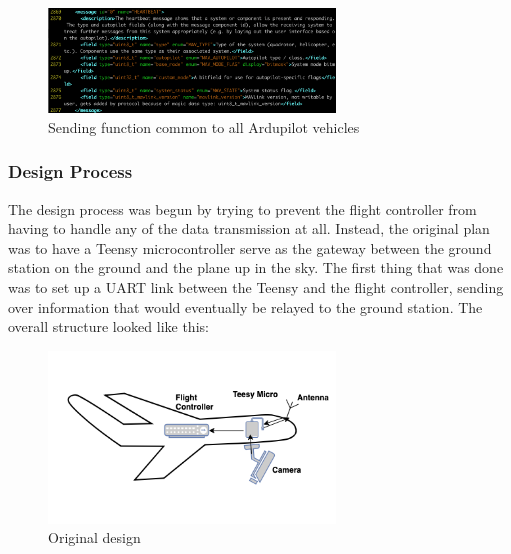\documentclass[12pt,journal,compsoc]{IEEEtran}
\begin{document}
\begin{figure}[h!]
\hspace*{0cm}
\centering
\includegraphics[width=3in]{message.png}
\caption{Sending function common to all Ardupilot vehicles}
\label{fallthrough}
\end{figure}

\subsubsection{Design Process}
The design process was begun by trying to prevent the flight controller from having to handle any of the data transmission at all. Instead, the original plan was to have a Teensy microcontroller serve as the gateway between the ground station on the ground and the plane up in the sky. The first thing that was done was to set up a UART link between the Teensy and the flight controller, sending over information that would eventually be relayed to the ground station. The overall structure looked like this:
\begin{figure}[h!]
\hspace*{0cm}
\centering
\includegraphics[width=3in]{Version1.png}
\caption{Original design}
\label{version1}
\end{figure}
\end{document}
